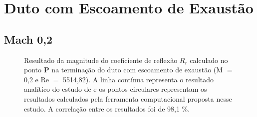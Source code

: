 \newpage
\section{Duto com Escoamento de Exaustão}

\subsection{Mach 0,2}
\begin{figure}[ht!]
\centering
  \caption[Coeficiente de Reflexão $R_{r}$ com Escoamento de Exaustão (M $=$ 0,2)]{Resultado da magnitude do coeficiente de reflexão $R_{r}$ calculado no ponto $\textbf{P}$ na terminação do duto com escoamento de exaustão (M $=$ 0,2 e Re $=$ 5514,82). A linha contínua representa o resultado analítico do estudo de  e os pontos circulares representam os resultados calculados pela ferramenta computacional proposta nesse estudo. A correlação entre os resultados foi de 98,1 \%.}
  \label{fig:abs_r_boca_020}
\end{figure}

